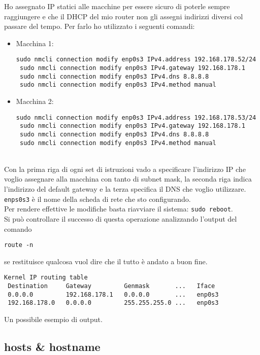 Ho assegnato IP statici alle macchine per essere sicuro di poterle sempre raggiungere e che il DHCP del mio router non gli assegni indirizzi diversi col passare del tempo. Per farlo ho utilizzato i seguenti comandi:

\begin{itemize}
	\item Macchina 1: 
	\begin{lstlisting}[style=cmd]
 sudo nmcli connection modify enp0s3 IPv4.address 192.168.178.52/24
 sudo nmcli connection modify enp0s3 IPv4.gateway 192.168.178.1
 sudo nmcli connection modify enp0s3 IPv4.dns 8.8.8.8
 sudo nmcli connection modify enp0s3 IPv4.method manual
	\end{lstlisting}
	\item Macchina 2:
		\begin{lstlisting}[style=cmd]
 sudo nmcli connection modify enp0s3 IPv4.address 192.168.178.53/24
 sudo nmcli connection modify enp0s3 IPv4.gateway 192.168.178.1
 sudo nmcli connection modify enp0s3 IPv4.dns 8.8.8.8
 sudo nmcli connection modify enp0s3 IPv4.method manual
	\end{lstlisting}
\end{itemize}
\ \\
Con la prima riga di ogni set di istruzioni vado a specificare l'indirizzo IP che voglio assegnare alla macchina con tanto di subnet mask, la seconda riga indica l'indirizzo del default gateway e la terza specifica il DNS che voglio utilizzare. \lstinline[style=cmd]|enps0s3| \`{e} il nome della scheda di rete che sto configurando.\\
Per rendere effettive le modifiche basta riavviare il sistema: \lstinline[style=cmd]|sudo reboot|.\\
Si pu\`{o} controllare il successo di questa operazione analizzando l'output del comando
\begin{lstlisting}[style=cmd]
 route -n
\end{lstlisting}
se restituisce qualcosa vuol dire che il tutto \`{e} andato a buon fine.\\

\begin{lstlisting}[style=output]
 Kernel IP routing table
 Destination     Gateway         Genmask       ...   Iface
 0.0.0.0         192.168.178.1   0.0.0.0       ...   enp0s3
 192.168.178.0   0.0.0.0         255.255.255.0 ...   enp0s3
\end{lstlisting}
Un possibile esempio di output.
\pagebreak

\subsection{hosts \& hostname}
\label{sec:hosts}

